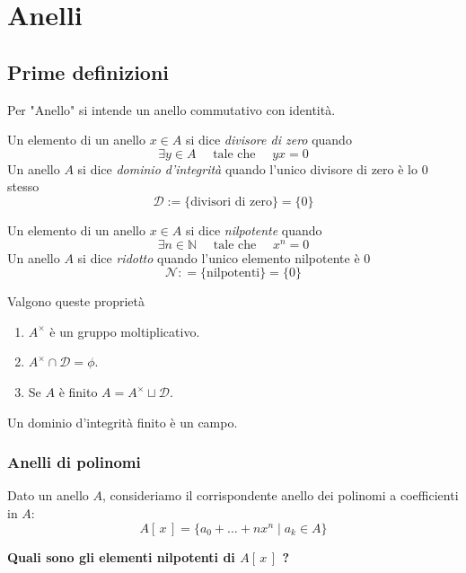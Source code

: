 \setcounter{section}{0} %
\section{Anelli}
\subsection{Prime definizioni}
\begin{multicols}{2}
Per "Anello" si intende un anello commutativo con identità.

\begin{definition}[Divisori di 0]
	Un elemento di un anello $ x \in A $ si dice \emph{divisore di zero} quando
	\[ \exists y \in A \quad\text{    tale che    }\quad yx = 0 \]
	Un anello $ A $ si dice \emph{dominio d'integrità} quando l'unico divisore di zero è lo 0 stesso
	\[ \mathcal{D}:= \{\text{divisori di zero}\} = \{0\} \]
\end{definition}
\begin{definition}[Nilpotenza]
	Un elemento di un anello $ x \in A $ si dice \emph{nilpotente} quando
	 \[ \exists n \in \mathbb{N} \quad\text{    tale che    }\quad x^n = 0 \]
	 Un anello $ A $ si dice \emph{ridotto} quando l'unico elemento nilpotente è 0
	 \[ \mathcal{N}: = \{\text{nilpotenti}\} = \{0\} \]
\end{definition}

\begin{theorem}
	Valgono queste proprietà
	\begin{enumerate}
		\item $ A^\times $ è un gruppo moltiplicativo.
		\item $ A^\times \cap \mathcal{D} = \phi $.
		\item Se $ A $ è finito $ A = A^\times \sqcup \mathcal{D} $.
	\end{enumerate}
\end{theorem}
\begin{remark}
	Un dominio d'integrità finito è un campo.
\end{remark}

\subsubsection{Anelli di polinomi}
Dato un anello $ A $, consideriamo il corrispondente anello dei polinomi a coefficienti in $ A $: $$  A[\,x\,] = \{ a_0 + \dots + n x^n \mid a_k \in A \}  $$

\textbf{Quali sono gli elementi nilpotenti di $ A[\,x\,] $ ?} \\


\end{multicols}
